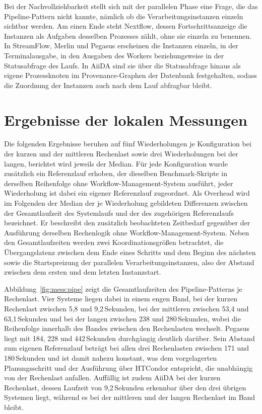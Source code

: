 Bei der Nachvollziehbarkeit stellt sich mit der parallelen Phase
eine Frage, die das Pipeline-Pattern nicht kannte, nämlich ob die
Verarbeitungsinstanzen einzeln sichtbar werden. Am einen Ende steht
Nextflow, dessen Fortschrittsanzeige die Instanzen als Aufgaben
desselben Prozesses zählt, ohne sie einzeln zu benennen. In
StreamFlow, Merlin und Pegasus erscheinen die Instanzen einzeln,
in der Terminalausgabe, in den Ausgaben des Workers beziehungsweise
in der Statusabfrage des Laufs. In AiiDA sind sie über die Statusabfrage hinaus als eigene Prozessknoten im Provenance-Graphen der Datenbank festgehalten,
sodass die Zuordnung der Instanzen auch nach dem Lauf abfragbar
bleibt.

\section{Ergebnisse der lokalen Messungen}
\label{sec:lokal:messungen}

Die folgenden Ergebnisse beruhen auf fünf Wiederholungen je
Konfiguration bei der kurzen und der mittleren Rechenlast sowie drei
Wiederholungen bei der langen, berichtet wird jeweils der Median.
Für jede Konfiguration wurde zusätzlich ein Referenzlauf erhoben,
der dieselben Benchmark-Skripte in derselben Reihenfolge ohne
Workflow-Management-System ausführt, jeder Wiederholung ist dabei
ein eigener Referenzlauf zugeordnet. Als Overhead wird im Folgenden
der Median der je Wiederholung gebildeten Differenzen zwischen der
Gesamtlaufzeit des Systemlaufs und der des zugehörigen
Referenzlaufs bezeichnet. Er beschreibt den zusätzlich
beobachteten Zeitbedarf gegenüber der Ausführung derselben
Rechenlogik ohne Workflow-Management-System. Neben den Gesamtlaufzeiten
werden zwei Koordinationsgrößen betrachtet, die Übergangslatenz
zwischen dem Ende eines Schritts und dem Beginn des nächsten sowie
die Startspreizung der parallelen Verarbeitungsinstanzen, also der
Abstand zwischen dem ersten und dem letzten Instanzstart.

Abbildung~\ref{fig:mess:pipe} zeigt die Gesamtlaufzeiten des
Pipeline-Patterns je Rechenlast. Vier Systeme liegen dabei in einem
engen Band, bei der kurzen Rechenlast zwischen 5,8 und
9,2\,Sekunden, bei der mittleren zwischen 53,4 und 63,1\,Sekunden
und bei der langen zwischen 238 und 280\,Sekunden, wobei die
Reihenfolge innerhalb des Bandes zwischen den Rechenlasten wechselt.
Pegasus liegt mit 184, 228 und 442\,Sekunden durchgängig deutlich
darüber. Sein Abstand zum eigenen Referenzlauf beträgt bei allen
drei Rechenlasten zwischen 171 und 180\,Sekunden und ist damit
nahezu konstant, was dem vorgelagerten Planungsschritt und der
Ausführung über HTCondor entspricht, die unabhängig von der
Rechenlast anfallen. Auffällig ist zudem AiiDA bei der kurzen
Rechenlast, dessen Laufzeit von 9,2\,Sekunden erkennbar über den
drei übrigen Systemen liegt, während es bei der mittleren und der
langen Rechenlast im Band bleibt.

